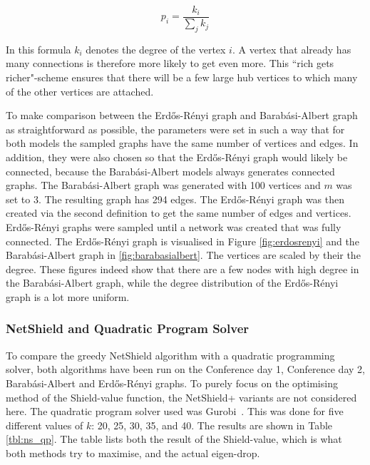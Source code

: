 \documentclass[11pt]{article}
\theoremstyle{definition}
\begin{document}
\begin{equation}
    p_i = \frac{k_i}{\sum_{j} k_j}
\end{equation}

In this formula $k_i$ denotes the degree of the vertex $i$. A vertex that already has many connections is therefore more likely to get even more. This ``rich gets richer"-scheme ensures that there will be a few large hub vertices to which many of the other vertices are attached. 

To make comparison between the Erd\H{o}s-R\'enyi graph and Barab\'asi-Albert graph as straightforward as possible, the parameters were set in such a way that for both models the sampled graphs have the same number of vertices and edges. In addition, they were also chosen so that the Erd\H{o}s-R\'enyi graph would likely be connected, because the Barab\'asi-Albert models always generates connected graphs. The Barab\'asi-Albert graph was generated with 100 vertices and $m$ was set to 3. The resulting graph has 294 edges. The Erd\H{o}s-R\'enyi graph was then created via the second definition to get the same number of edges and vertices. Erd\H{o}s-R\'enyi graphs were sampled until a network was created that was fully connected. The Erd\H{o}s-R\'enyi graph is visualised in Figure \ref{fig:erdosrenyi} and the  Barab\'asi-Albert graph in \ref{fig:barabasialbert}. The vertices are scaled by their the degree. These figures indeed show that there are a few nodes with high degree in the Barab\'asi-Albert graph, while the degree distribution of the Erd\H{o}s-R\'enyi graph is a lot more uniform.

\subsubsection{NetShield and Quadratic Program Solver}

To compare the greedy NetShield algorithm with a quadratic programming solver, both algorithms have been run on the Conference day 1, Conference day 2, Barab\'asi-Albert and Erd\H{o}s-R\'enyi graphs. To purely focus on the optimising method of the Shield-value function, the NetShield+ variants are not considered here. The quadratic program solver used was Gurobi~\cite{gurobi}. This was done for five different values of $k$: 20, 25, 30, 35, and 40. The results are shown in Table \ref{tbl:ns_qp}. The table lists both the result of the Shield-value, which is what both methods try to maximise, and the actual eigen-drop.
\end{document}
